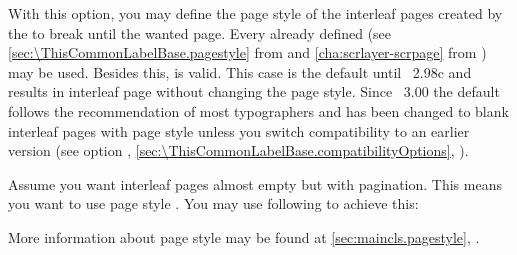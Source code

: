 \begin{Declaration}
\end{Declaration}%
With this option, %
you may define the page style of the interleaf pages created by the
 to break until the wanted page. Every already defined
 (see \autoref{sec:\ThisCommonLabelBase.pagestyle} from
 and
\autoref{cha:scrlayer-scrpage} from ) may be
used. Besides this,  is valid. This case
is the default until \KOMAScript~2.98c and results in interleaf page without
changing the page style. Since \KOMAScript~3.00%
the default follows the recommendation of most typographers and has been
changed to blank interleaf pages with page style  unless you
switch compatibility to an earlier version (see option
,
\autoref{sec:\ThisCommonLabelBase.compatibilityOptions},
).
\IfThisCommonLabelBase{maincls}{\iftrue}{\csname iffalse\endcsname}
  \begin{Example}
    \label{xmpl:\ThisCommonLabelBase.option.cleardoublepage}%
    Assume you want interleaf pages almost empty but with pagination. This
    means you want to use page style . You may use following
    to achieve this:
\begin{lstcode}
\end{lstcode}
    More information about page style  may be found at
    \autoref{sec:maincls.pagestyle},
    .
  \end{Example}
\else
  \IfThisCommonLabelBase{scrextend}{\iftrue}{\csname iffalse\endcsname}
    \begin{Example}
      \phantomsection\label{xmpl:\ThisCommonLabelBase.option.cleardoublepage}%
      Assume you want interleaf pages almost empty but with pagination. This
      means you want to use page style \PageStyle{plain}. You may use
      following to achieve this:
\begin{lstcode}
  \KOMAoptions{cleardoublepage=plain}
\end{lstcode}
      More information about page style \PageStyle{plain} may be found at
      \autoref{sec:maincls.pagestyle},
      \autopageref{desc:maincls.pagestyle.plain}.
    \end{Example}%
  \fi%
\fi%
\EndIndexGroup


